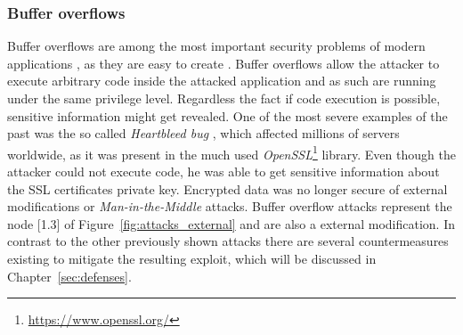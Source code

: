 \subsubsection{Buffer overflows}
Buffer overflows are among the most important security problems of modern applications \cite{pethia}, as they are easy to create \cite{bufferoverflows_easy}. Buffer overflows allow the attacker to execute arbitrary code inside the attacked application and as such are running under the same privilege level. Regardless the fact if code execution is possible, sensitive information might get revealed. One of the most severe examples of the past was the so called \emph{Heartbleed bug} \cite{durumeri}, which affected millions of servers worldwide, as it was present in the much used \emph{OpenSSL}\footnote{\url{https://www.openssl.org/}} library. Even though the attacker could not execute code, he was able to get sensitive information about the SSL certificates private key. Encrypted data was no longer secure of external modifications or \emph{Man-in-the-Middle} attacks. Buffer overflow attacks represent the node [1.3] of Figure~\ref{fig:attacks_external} and are also a external modification. In contrast to the other previously shown attacks there are several countermeasures existing to mitigate the resulting exploit, which will be discussed in Chapter~\ref{sec:defenses}.